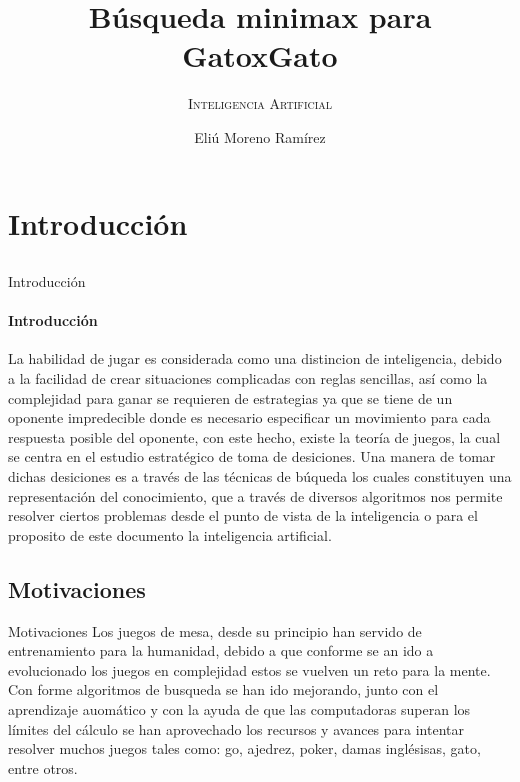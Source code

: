 \documentclass{beamer}
\title{Búsqueda minimax para GatoxGato}
\author[Abbr]{Eliú Moreno Ramírez}
\subtitle{\textsc{Inteligencia Artificial}}
\institute{\textsc{Instituto Nacional de Astrofísica, Óptica y Electrónica } \\
        [5pt]{ Maestría en Ciencias Computacionales \\
         eliu.moreno.ramirez@gmail.com\\}
        
        }
\begin{document}

\typesetFrontSlides


%
%

\section{Introducción}

\subsection{ }


\begin{frame}{Introducción}
\framesubtitle{Introducción}

La habilidad de jugar es considerada como una distincion de inteligencia, debido a la facilidad de crear situaciones complicadas con reglas sencillas, así como la complejidad para ganar se requieren de estrategias ya que se tiene de un oponente impredecible donde es necesario especificar un movimiento para cada respuesta posible del oponente, con este hecho, existe la teoría de juegos, la cual se centra en el estudio estratégico de toma de desiciones. Una manera de tomar dichas desiciones es a través de las técnicas de búqueda los cuales constituyen una representación del conocimiento, que a través de diversos algoritmos nos permite resolver ciertos problemas desde el punto de vista de la inteligencia o para el proposito de este documento la inteligencia artificial. 

\end{frame}


\subsection{Motivaciones}

\begin{frame}{Motivaciones}
	Los juegos de mesa, desde su principio han servido de entrenamiento para la humanidad, debido a que conforme se an ido a evolucionado los juegos en complejidad estos se vuelven un reto para la mente. Con forme algoritmos de busqueda se han ido mejorando, junto con el aprendizaje auomático y con la ayuda de que las computadoras superan los límites del cálculo se han aprovechado los recursos y avances para intentar resolver muchos juegos tales como: go, ajedrez, poker, damas inglésisas, gato, entre otros. 


\end{frame}
\end{document}
